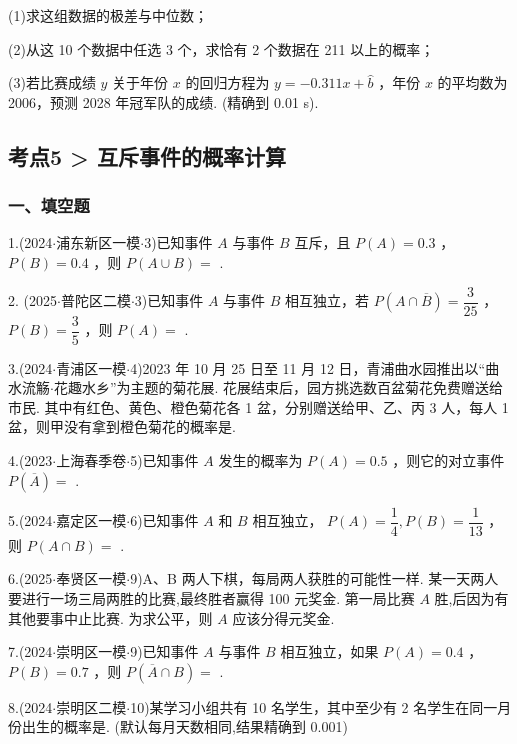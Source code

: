 (1)求这组数据的极差与中位数；

(2)从这 10 个数据中任选 3 个，求恰有 2 个数据在 211 以上的概率；

(3)若比赛成绩 $y$ 关于年份 $x$ 的回归方程为 $y =  - {0.311x} + \widehat{b}$ ，年份 $x$ 的平均数为 2006，预测 2028 年冠军队的成绩. (精确到 0.01 s).

\subsection*{考点5 > 互斥事件的概率计算}

\subsubsection*{一、填空题}

1.(2024$\cdot$浦东新区一模$\cdot$3)已知事件 $A$ 与事件 $B$ 互斥，且 $P\left( A\right)  = {0.3}$ ， $P\left( B\right)  = {0.4}$ ，则 $P\left( {A \cup  B}\right)  =$ \blkda[2]{}.

2. (2025$\cdot$普陀区二模$\cdot$3)已知事件 $A$ 与事件 $B$ 相互独立，若 $P\left( {A \cap  \overline{B}}\right)  = \dfrac{3}{25}$ ， $P\left( B\right)  = \dfrac{3}{5}$ ，则 $P\left( A\right)  =$ \blkda[2]{}.

3.(2024$\cdot$青浦区一模$\cdot$4)2023 年 10 月 25 日至 11 月 12 日，青浦曲水园推出以“曲水流觞$\cdot$花趣水乡”为主题的菊花展. 花展结束后，园方挑选数百盆菊花免费赠送给市民. 其中有红色、黄色、橙色菊花各 1 盆，分别赠送给甲、乙、丙 3 人，每人 1 盆，则甲没有拿到橙色菊花的概率是\blkda[2]{}.

4.(2023$\cdot$上海春季卷$\cdot$5)已知事件 $A$ 发生的概率为 $P\left( A\right)  = {0.5}$ ，则它的对立事件 $P\left( \overline{A}\right)  =$ \blkda[2]{}.

5.(2024$\cdot$嘉定区一模$\cdot$6)已知事件 $A$ 和 $B$ 相互独立， $P\left( A\right)  = \dfrac{1}{4},P\left( B\right)  = \dfrac{1}{13}$ ，则 $P\left( {A \cap  B}\right)  =$ \blkda[2]{}.

6.(2025$\cdot$奉贤区一模$\cdot$9)A、B 两人下棋，每局两人获胜的可能性一样. 某一天两人要进行一场三局两胜的比赛,最终胜者赢得 100 元奖金. 第一局比赛 $A$ 胜,后因为有其他要事中止比赛. 为求公平，则 $A$ 应该分得\blkda[2]{}元奖金.

7.(2024$\cdot$崇明区一模$\cdot$9)已知事件 $A$ 与事件 $B$ 相互独立，如果 $P\left( A\right)  = {0.4}$ ， $P\left( B\right)  = {0.7}$ ，则 $P\left( {\overline{A} \cap  B}\right)  =$ \blkda[2]{}.

8.(2024$\cdot$崇明区二模$\cdot$10)某学习小组共有 10 名学生，其中至少有 2 名学生在同一月份出生的概率是\blkda[2]{}. (默认每月天数相同,结果精确到 0.001)

